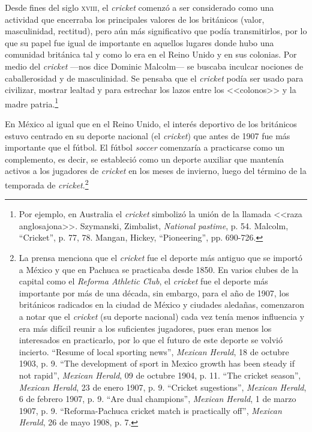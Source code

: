 \documentclass[11pt,a5paper,twoside]{book} %
\begin{document}
Desde fines del siglo \textsc{xviii}, el \emph{cricket} comenzó a ser considerado como una actividad
que encerraba los principales valores de los británicos (valor, masculinidad, rectitud), pero
aún más significativo que podía transmitirlos, por lo que su papel fue igual de importante en
aquellos lugares donde hubo una comunidad británica tal y como lo era en el Reino Unido y
en sus colonias. Por medio del \emph{cricket} ---nos dice Dominic Malcolm--- se buscaba inculcar
nociones de caballerosidad y de masculinidad. Se pensaba que el \emph{cricket} podía ser usado para civilizar, mostrar lealtad y para estrechar los lazos entre los <<colonos>> y la madre patria.\footnote{Por ejemplo, en Australia el \emph{cricket} simbolizó la unión de la llamada <<raza anglosajona>>. Szymanski, Zimbalist, \emph{National pastime}, p. 54. Malcolm, ``Cricket'', p. 77, 78. Mangan, Hickey, ``Pioneering'', pp. 690-726.}

En México al igual que en el Reino Unido, el interés deportivo de los británicos
estuvo centrado en su deporte nacional (el \emph{cricket}) que antes de 1907 fue más importante que
el fútbol. El fútbol \emph{soccer} comenzaría a practicarse como un complemento, es decir, se estableció como un deporte auxiliar que mantenía activos a los jugadores de \emph{cricket} en los meses de invierno, luego del término de la temporada de \emph{cricket}.\footnote{La prensa menciona que el \emph{cricket} fue el deporte más antiguo que se importó a México y que en Pachuca se practicaba desde 1850. En varios clubes de la capital como el \emph{Reforma Athletic Club}, el \emph{cricket} fue el deporte más importante por más de una década, sin embargo, para el año de 1907, los británicos radicados en la ciudad de México y ciudades aledañas, comenzaron a notar que el \emph{cricket} (su deporte nacional) cada vez tenía menos influencia y era más difícil reunir a los suficientes jugadores, pues eran menos los interesados en practicarlo, por lo que el futuro de este deporte se volvió incierto. ``Resume of local sporting news'', \emph{Mexican Herald}, 18 de octubre 1903, p. 9. ``The development of sport in Mexico growth has been steady if not rapid'', \emph{Mexican Herald}, 09 de octubre 1904, p. 11. ``The cricket season'', \emph{Mexican Herald}, 23 de enero 1907, p. 9. ``Cricket sugestions'', \emph{Mexican Herald}, 6 de febrero 1907, p. 9. ``Are dual champions'', \emph{Mexican Herald}, 1 de marzo 1907, p. 9.
``Reforma-Pachuca cricket match is practically off'', \emph{Mexican Herald}, 26 de mayo 1908, p. 7.}
\end{document}
